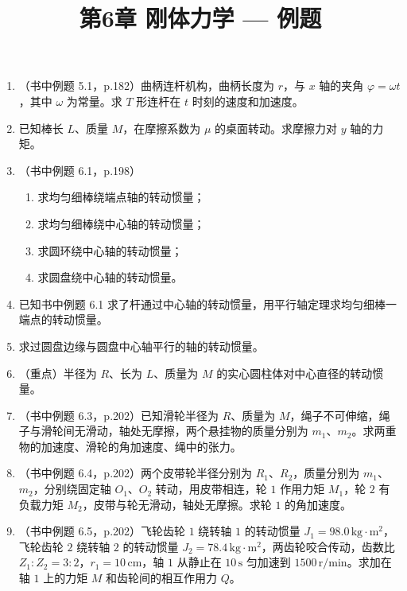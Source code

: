 \documentclass{ctexart}
\title{\textbf{第6章 刚体力学} --- 例题}
\author{}
\date{}
\begin{document}
\maketitle

\begin{enumerate}

\item（书中例题 5.1，p.182）曲柄连杆机构，曲柄长度为 $r$，与 $x$ 轴的夹角 $\varphi = \omega t$，其中 $\omega$ 为常量。求 $T$ 形连杆在 $t$ 时刻的速度和加速度。

\item 已知棒长 $L$、质量 $M$，在摩擦系数为 $\mu$ 的桌面转动。求摩擦力对 $y$ 轴的力矩。

\item（书中例题 6.1，p.198）
\begin{enumerate}
  \item 求均匀细棒绕端点轴的转动惯量；
  \item 求均匀细棒绕中心轴的转动惯量；
  \item 求圆环绕中心轴的转动惯量；
  \item 求圆盘绕中心轴的转动惯量。
\end{enumerate}

\item 已知书中例题 6.1 求了杆通过中心轴的转动惯量，用平行轴定理求均匀细棒一端点的转动惯量。

\item 求过圆盘边缘与圆盘中心轴平行的轴的转动惯量。

\item（重点）半径为 $R$、长为 $L$、质量为 $M$ 的实心圆柱体对中心直径的转动惯量。

\item（书中例题 6.3，p.202）已知滑轮半径为 $R$、质量为 $M$，绳子不可伸缩，绳子与滑轮间无滑动，轴处无摩擦，两个悬挂物的质量分别为 $m_1$、$m_2$。求两重物的加速度、滑轮的角加速度、绳中的张力。

\item（书中例题 6.4，p.202）两个皮带轮半径分别为 $R_1$、$R_2$，质量分别为 $m_1$、$m_2$，分别绕固定轴 $O_1$、$O_2$ 转动，用皮带相连，轮 $1$ 作用力矩 $M_1$，轮 $2$ 有负载力矩 $M_2$，皮带与轮无滑动，轴处无摩擦。求轮 $1$ 的角加速度。

\item（书中例题 6.5，p.202）飞轮齿轮 $1$ 绕转轴 $1$ 的转动惯量 $J_1 = 98.0\,\text{kg}\cdot\text{m}^{2}$，飞轮齿轮 $2$ 绕转轴 $2$ 的转动惯量 $J_2 = 78.4\,\text{kg}\cdot\text{m}^{2}$，两齿轮咬合传动，齿数比 $Z_1:Z_2 = 3:2$，$r_1 = 10\,\text{cm}$，轴 $1$ 从静止在 $10\,\text{s}$ 匀加速到 $1500\,\text{r/min}$。求加在轴 $1$ 上的力矩 $M$ 和齿轮间的相互作用力 $Q$。


\end{enumerate}
\end{document}
